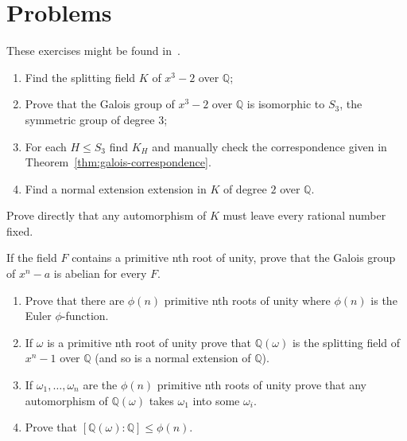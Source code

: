 \section{Problems}\label{sec:problems}

These exercises might be found in~\cite{herstein_topics_2010}.

\begin{problem}
\begin{enumerate}
	\item Find the splitting field $K$ of $x^{3}-2$ over $\mathbb{Q}$;
	\item Prove that the Galois group of $x^{3}-2$ over $\mathbb{Q}$ is
	      isomorphic to $S_{3}$, the symmetric group of degree $3$;
	\item For each ${H}\leqslant{S_{3}}$ find $K_{H}$ and manually check the
	      correspondence given in Theorem~\ref{thm:galois-correspondence}.
	\item Find a normal extension extension in $K$ of degree $2$ over
	      $\mathbb{Q}$.
\end{enumerate}
\end{problem}

\begin{problem}
Prove directly that any automorphism of $K$ must leave every rational number
fixed.
\end{problem}

\begin{problem}
If the field $F$ contains a primitive nth root of unity, prove that the
Galois group of $x^{n}-a$ is abelian for every $F$.
\end{problem}

\begin{problem}\label{problem:13}
\begin{enumerate}
	\item Prove that there are $\phi(n)$ primitive nth roots of unity where
	      $\phi(n)$ is the Euler $\phi$-function.
	\item If $\omega$ is a primitive nth root of unity prove that
	      $\mathbb{Q}(\omega)$ is the splitting field of $x^{n}-1$ over
	      $\mathbb{Q}$ (and so is a normal extension of $\mathbb{Q}$).
	\item If $\omega_{1},\ldots,\omega_{n}$ are the $\phi(n)$ primitive nth roots
	      of unity prove that any automorphism of $\mathbb{Q}(\omega)$ takes
	      $\omega_{1}$ into some $\omega_{i}$.
	\item Prove that $[\mathbb{Q}(\omega):\mathbb{Q}]\leqslant\phi(n)$.
\end{enumerate}
\end{problem}

